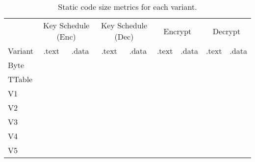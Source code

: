 \begin{table}
\centering
\begin{tabular}{l|cc|cc|cc|cc}
 &
\multicolumn{2}{c}{Key Schedule (Enc)} &
\multicolumn{2}{c}{Key Schedule (Dec)} &
\multicolumn{2}{c}{Encrypt} &
\multicolumn{2}{c}{Decrypt}  \\
Variant & .text & .data & .text & .data & .text & .data & .text & .data  \\ \hline
Byte    &       &       &       &       &       &       &       &        \\
TTable  &       &       &       &       &       &       &       &        \\
V1      &       &       &       &       &       &       &       &        \\
V2      &       &       &       &       &       &       &       &        \\
V3      &       &       &       &       &       &       &       &        \\
V4      &       &       &       &       &       &       &       &        \\
V5      &       &       &       &       &       &       &       &        \\
\end{tabular}
\caption{
Static code size metrics for each variant.
}
\label{tab:eval:sw:size}
\end{table}


